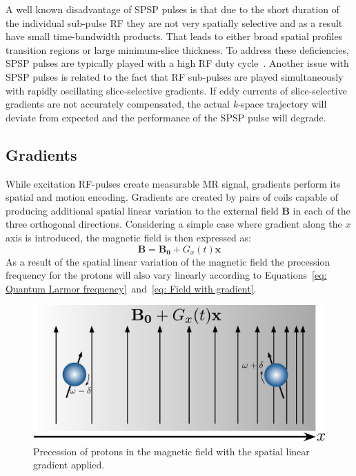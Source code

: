 A well known disadvantage of SPSP pulses is that due to the short duration of the individual sub-pulse RF they are not very spatially selective and as a result have small time-bandwidth products. 
That leads to either  broad spatial profiles transition regions or large minimum-slice thickness. 
To address these deficiencies, SPSP pulses are typically played with a high RF duty cycle~\cite{RNDT24}. 
Another issue with SPSP pulses is related to the fact that RF sub-pulses are played simultaneously with rapidly oscillating slice-selective gradients. 
If eddy currents of slice-selective gradients are not accurately compensated, the actual \mbox{\textit{k-}space} trajectory will deviate from expected and the performance of the SPSP pulse will degrade.
\subsection{Gradients}
While excitation RF-pulses create measurable MR signal, gradients perform its spatial and motion encoding. 
Gradients are created by pairs of coils capable of producing additional spatial linear variation to the external field $\mathbf{B}$ in each of the three orthogonal directions. 
Considering a simple case where gradient along the $x$ axis is introduced, the  magnetic field is then expressed as:
\begin{equation}\label{eq: Field with gradient}
	\mathbf{B} = \mathbf{B_0} + G_x(t) \mathbf{x}
\end{equation}
As a result of the spatial linear variation of the magnetic field the precession frequency for the protons will also vary linearly according to Equations~\ref{eq: Quantum Larmor frequency}~and~\ref{eq: Field with gradient}.
\begin{figure}[!h]
\vspace{+0.2cm}
\centering
\includegraphics[scale=.4]{Figures/ProtonGradient.pdf}
\caption[Precession of protons in the magnetic field with the spatial linear gradient]{Precession of protons in the magnetic field with the spatial linear gradient applied.}
\label{fig: ProtonGradient}
\end{figure}
